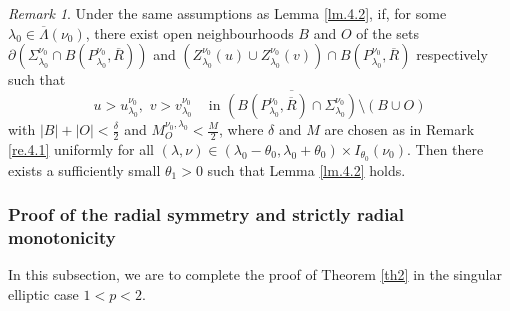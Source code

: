 \documentclass[12pt]{amsart}
\theoremstyle{definition}
\theoremstyle{remark}
\newtheorem{rem}[thm]{Remark}
\theoremstyle{conclusion}
\theoremstyle{conjecture}
\numberwithin{equation}{section}
\begin{document}
\begin{rem}\label{re.4.2}
Under the same assumptions as Lemma \ref{lm.4.2}, if, for some $\lambda_0 \in \overline{\Lambda}(\nu_0)$, there exist open neighbourhoods $B$ and $O$ of the sets $\partial\left(\Sigma^{\nu_0}_{\lambda_0} \cap B(P^{\nu_0}_{\lambda_0},\overline{R})\right)$ and $\left(Z_{\lambda_0}^{\nu_0}(u) \cup Z_{\lambda_0}^{\nu_0}(v)\right)\cap B(P^{\nu_0}_{\lambda_0},\overline{R})$ respectively such that
$$ u>u^{\nu_0}_{\lambda_0},\,\,v>v_{\lambda_0}^{\nu_0}\quad\, \mbox{in}\,\,\overline{\left(B(P^{\nu_0}_{\lambda_0},\overline{R})\cap \Sigma^{\nu_0}_{\lambda_0}\right)}\setminus (B\cup O) $$
with $|B|+|O|<\frac{\delta}{2}$ and $M_O^{\nu_0,\lambda_0}<\frac{M}{2}$, where $\delta$ and $M$ are chosen as in Remark \ref{re.4.1} uniformly for all  $(\lambda,\nu)\in (\lambda_0-\theta_0, \lambda_0+\theta_0)\times I_{\theta_0}(\nu_0)$. Then there exists a sufficiently small $\theta_1>0$ such that Lemma \ref{lm.4.2} holds.
\end{rem}

\subsubsection{Proof of the radial symmetry and strictly radial monotonicity}

In this subsection, we are to complete the proof of Theorem \ref{th2} in the singular elliptic case $1<p<2$.
\end{document}
